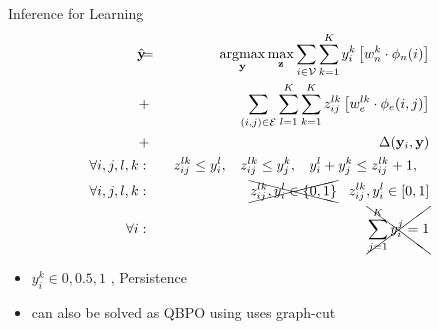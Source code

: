\documentclass{beamer}
\DeclareMathOperator*{\argmax}{argmax}
\newcommand{\y}{{\mathbf y}}     %
\newcommand{\ysc}[2]{{y_{#1}^{#2}}}    %
\newcommand{\zsc}[2]{{z_{#1}^{#2}}}    %
\newcommand{\fn}[1]{{\phi_n(#1)}}      %
\newcommand{\fe}[3]{{\phi_{#1}(#2,#3)}}%
\newcommand{\wn}[1]{{w_n^{#1}}}        %
\newcommand{\we}[3]{{w_{#1}^{#2#3}}}   %
\newcommand{\loss}[2]{{\Delta(#1,#2)}}   %
\begin{document}

\begin{frame}{Inference for Learning}
 \begin{eqnarray*}
\hat{\y}\!\!\!&=&\!\!\!\argmax_{\y}\max_{\mathbf z} \sum_{i \in \mathcal{V}} \sum_{k=1}^{K} \ysc{i}{k} \left[\wn{k} \cdot \fn{i} \right] \\
&+&  \!\!\!\sum_{(i,j)\in \mathcal{E}}  \sum_{l=1}^{K}  \sum_{k=1}^{K}  \zsc{ij}{lk} \left[\we{e}{l}{k} \cdot \fe{e}{i}{j}\right] \\
&+& \loss{\y_i}{\y} \label{eq:relaxobj}\\
\forall i,j,l,k &:& \:\: \zsc{ij}{lk}\le \ysc{i}{l}, \:\:\:\:
\zsc{ij}{lk}\le \ysc{j}{k},\:\:\:\:
\ysc{i}{l} + \ysc{j}{k} \le \zsc{ij}{lk}+1,\:\:\:\: \\
\forall i,j,l,k &:& \xcancel{ \zsc{ij}{lk},\ysc{i}{l} \in \{ 0,1 \} } \;\;\; \zsc{ij}{lk},\ysc{i}{l} \in [ 0,1 ] \\
\forall i &:& \xcancel{\sum_{j=1}^{K} y_i^j = 1 }
\end{eqnarray*} 

\begin{itemize}
 \item $y_i^k\in{0,0.5,1}$ , Persistence
 \item can also be solved as QBPO using uses graph-cut
\end{itemize}

\end{frame}
\end{document}

